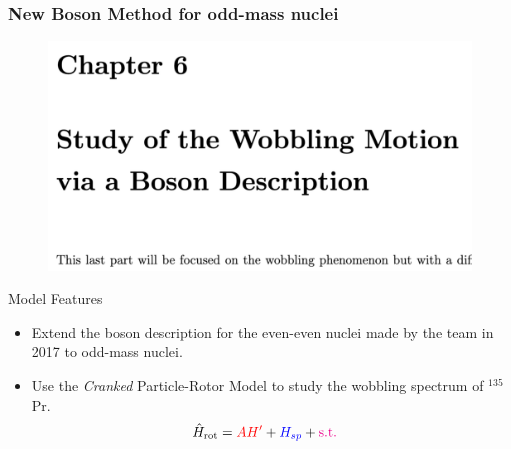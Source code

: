 \documentclass{beamer}
\begin{document}
\begin{frame}
	\frametitle{New Boson Method for odd-mass nuclei}
	\begin{figure}
		\centering
		\includegraphics[scale=0.3]{figures/chapter-6-screenshot.pdf}
	\end{figure}
	\vspace{-1cm}
	\begin{alertblock}{Model Features}
		\begin{itemize}
			\item Extend the boson description for the even-even nuclei made by the team in 2017 to odd-mass nuclei.
			\item Use the \emph{Cranked} Particle-Rotor Model to study the wobbling spectrum of $^{135}$Pr.
			\begin{align}
				\hat{H}_\text{rot}&={\color{red}AH'}+{\color{blue}H_{sp}}+{\color{magenta}\text{s.t.}}\nonumber
			\end{align}
		\end{itemize}
	\end{alertblock}


\end{frame}
\end{document}
